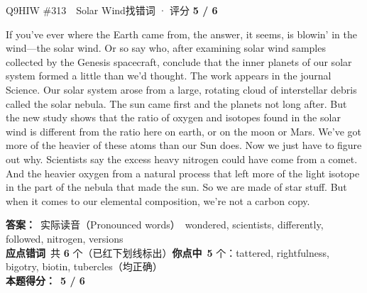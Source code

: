 \begin{qblock}{Q9\quad HIW \#313\ \ Solar Wind}{找错词 · 评分 \textcolor{cAccent}{\bfseries 5 / 6}}
\begin{promptbox}
If you've ever  where the Earth came from, the answer, it seems, is blowin' in the wind---the solar wind. Or so say  who, after examining solar wind samples collected by the Genesis spacecraft, conclude that the inner planets of our solar system formed a little  than we'd thought. The work appears in the journal Science. Our solar system arose from a large, rotating cloud of interstellar debris called the solar nebula. The sun came first and the planets  not long after. But the new study shows that the ratio of oxygen and  isotopes found in the solar wind is different from the ratio here on earth, or on the moon or Mars. We've got more of the heavier  of these atoms than our Sun does. Now we just have to figure out why. Scientists say the excess heavy nitrogen could have come from a comet. And the heavier oxygen from a natural process that left more of the light isotope in the part of the nebula that made the sun. So we are made of star stuff. But when it comes to our elemental composition, we're not a carbon copy.
\end{promptbox}
\par\smallskip
\textbf{答案：}\ 实际读音（Pronounced words）\ {\color{cFix}wondered, scientists, differently, followed, nitrogen, versions}\\
\textbf{应点错词}\ 共 \textbf{6} 个（已红下划线标出）\qquad\textbf{你点中}\ \textbf{5} 个：tattered, rightfulness, bigotry, biotin, tubercles（均正确）\\[2pt]\textbf{本题得分：}\ {\color{cAccent}\bfseries 5 / 6}
\end{qblock}

